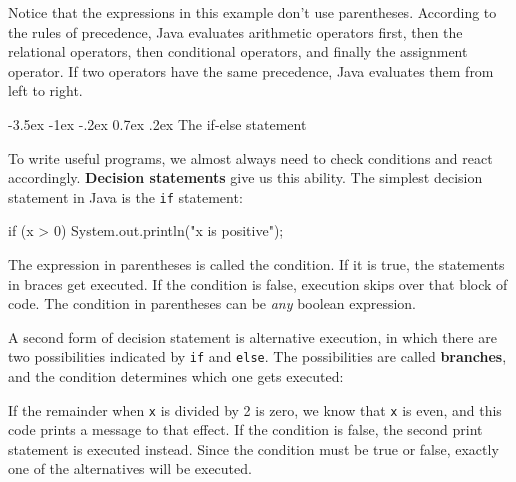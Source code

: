 \documentclass[12pt]{book}
\makeatletter
\renewcommand{\section}{\@startsection {section}{1}{\z@}%
    {-3.5ex \@plus -1ex \@minus -.2ex}%
    {0.7ex \@plus.2ex}%
    {\normalfont\Large\bfseries}}
\theoremstyle{exercise}
\newcommand{\java}[1]{\lstinline{#1}} %
\makeatother
\begin{document}
Notice that the expressions in this example don't use parentheses.
According to the rules of precedence, Java evaluates arithmetic operators first, then the relational operators, then conditional operators, and finally the assignment operator.
If two operators have the same precedence, Java evaluates them from left to right.


\section{The if-else statement}


To write useful programs, we almost always need to check conditions and react accordingly.
{\bf Decision statements} give us this ability.
The simplest decision statement in Java is the \java{if} statement:

\begin{code}
    if (x > 0) {
        System.out.println("x is positive");
    }
\end{code}

The expression in parentheses is called the condition.
If it is true, the statements in braces get executed.
If the condition is false, execution skips over that block of code.
The condition in parentheses can be {\it any} boolean expression.


A second form of decision statement is alternative execution, in which there are two possibilities indicated by \java{if} and \java{else}.
The possibilities are called {\bf branches}, and the condition determines which one gets executed:


If the remainder when \java{x} is divided by 2 is zero, we know that \java{x} is even, and this code prints a message to that effect.
If the condition is false, the second print statement is executed instead.
Since the condition must be true or false, exactly one of the alternatives will be executed.
\end{document}
